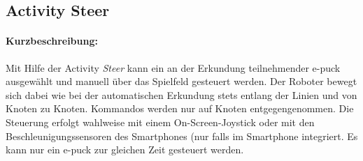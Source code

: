 \documentclass[10pt,a4paper]{article}
\begin{document}
 	\subsection{Activity Steer}
 		\paragraph*{Kurzbeschreibung:}
 		Mit Hilfe der Activity \textit{Steer} kann ein an der Erkundung teilnehmender e-puck ausgewählt und manuell über das
 		Spielfeld gesteuert werden. Der Roboter bewegt sich dabei wie bei der automatischen Erkundung stets entlang der Linien und von Knoten zu
 		Knoten. Kommandos werden nur auf Knoten entgegengenommen. Die Steuerung erfolgt wahlweise mit einem On-Screen-Joystick oder mit den
 		Beschleunigungssensoren des Smartphones (nur falls im Smartphone integriert. Es kann nur ein e-puck zur gleichen Zeit gesteuert werden.
 		
\end{document}
